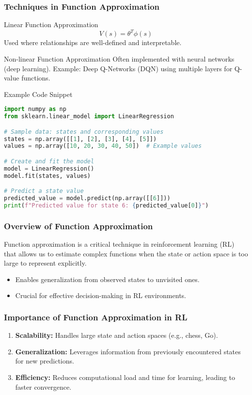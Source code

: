 \documentclass[aspectratio=169]{beamer}
\begin{document}
\begin{frame}[fragile]
    \frametitle{Techniques in Function Approximation}
    \begin{block}{Linear Function Approximation}
        \begin{equation} 
            V(s) = \theta^T \phi(s) 
        \end{equation}
        Used where relationships are well-defined and interpretable.
    \end{block}

    \begin{block}{Non-linear Function Approximation}
        Often implemented with neural networks (deep learning).
        Example: Deep Q-Networks (DQN) using multiple layers for Q-value functions.
    \end{block}

    \begin{block}{Example Code Snippet}
        \begin{lstlisting}[language=Python]
import numpy as np
from sklearn.linear_model import LinearRegression

# Sample data: states and corresponding values
states = np.array([[1], [2], [3], [4], [5]])
values = np.array([10, 20, 30, 40, 50])  # Example values

# Create and fit the model
model = LinearRegression()
model.fit(states, values)

# Predict a state value
predicted_value = model.predict(np.array([[6]]))
print(f"Predicted value for state 6: {predicted_value[0]}")
        \end{lstlisting}
    \end{block}
\end{frame}

\begin{frame}[fragile]
    \frametitle{Overview of Function Approximation}
    Function approximation is a critical technique in reinforcement learning (RL) that allows us to estimate complex functions when the state or action space is too large to represent explicitly. 
    \begin{itemize}
        \item Enables generalization from observed states to unvisited ones.
        \item Crucial for effective decision-making in RL environments.
    \end{itemize}
\end{frame}

\begin{frame}[fragile]
    \frametitle{Importance of Function Approximation in RL}
    \begin{enumerate}
        \item \textbf{Scalability:} Handles large state and action spaces (e.g., chess, Go).
        \item \textbf{Generalization:} Leverages information from previously encountered states for new predictions.
        \item \textbf{Efficiency:} Reduces computational load and time for learning, leading to faster convergence.
    \end{enumerate}
\end{frame}
\end{document}
